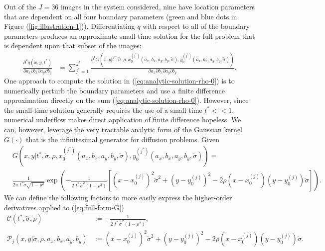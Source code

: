 \documentclass[10pt]{article}
\begin{document}
Out of the $J=36$ images in the system considered, nine have location
parameters that are dependent on all four boundary parameters (green
and blue dots in Figure (\ref{fig:illustration-1})). Differentiating
$\bar{q}$ with respect to all of the boundary parameters produces an
approximate small-time solution for the full problem that is dependent
upon that subset of the images:
\begin{align}
  \frac{\partial^4 \bar{q}(x, y, t^{*})}{\partial a_x
  \partial b_x \partial a_y \partial b_y} &= \sum_{j^*=1}^{J^*} \frac{\partial^4
                                            G(x,y|t^{*}, \tilde{\sigma}, \rho, x_0^{(j^*)}(a_x, b_x, a_y, b_y, \tilde{\sigma}),
                                            y_0^{(j^*)}(a_x, b_x, a_y, b_y, \tilde{\sigma}))} {\partial a_x \partial b_x
                                            \partial a_y \partial b_y}. \label{eq:analytic-solution-rho-0}
\end{align}
One approach to compute the solution in
(\ref{eq:analytic-solution-rho-0}) is to numerically perturb the
boundary parameters and use a finite difference approximation directly
on the sum (\ref{eq:analytic-solution-rho-0}). However, since the
small-time solution generally requires the use of a small time
$t^* << 1$, numerical underflow makes direct application of finite
difference hopeless. We can, however, leverage the very tractable
analytic form of the Gaussian kernel $G(\cdot)$ that is the
infinitesimal generator for diffusion problems. Given
\begin{align}
  & G(x,y | t^{*}, \tilde{\sigma}, \rho, x_0^{(j^*)}(a_x, b_x, a_y, b_y, \tilde{\sigma}),
    y_0^{(j^*)}(a_x, b_x, a_y, b_y, \tilde{\sigma})) = &  \nonumber \\
  & \frac{1}{2\pi\,\, t^{*}\tilde{\sigma}\sqrt{1-\rho^2}} \exp\left( -\frac{1}{2\,\,t^*\, \tilde{\sigma}^2 (1-\rho^2)} \left[ \left(x-x_0^{(j)}\right)^2 \tilde{\sigma}^2 + \left(y-y_0^{(j)}\right)^2 - 2\rho(x-x_0^{(j)})(y-y_0^{(j)})\tilde{\sigma} \right]\right). & \label{eq:full-form-G}
\end{align}
We can define the following factors to more easily express the
higher-order derivatives applied to (\ref{eq:full-form-G})
\begin{align*}                
  \mathcal{C}(t^*, \tilde{\sigma}, \rho) &:= -\frac{1}{2\,\,t^*\, \tilde{\sigma}^2 (1-\rho^2)}, \\
  \mathcal{P}_j(x,y | \tilde{\sigma}, \rho, a_x,b_x,a_y,b_y) &:= \left(x-x_0^{(j)}\right)^2 \tilde{\sigma}^2 + \left(y-y_0^{(j)}\right)^2 - 2\rho(x-x_0^{(j)})(y-y_0^{(j)})\tilde{\sigma}.
\end{align*}
\end{document}
